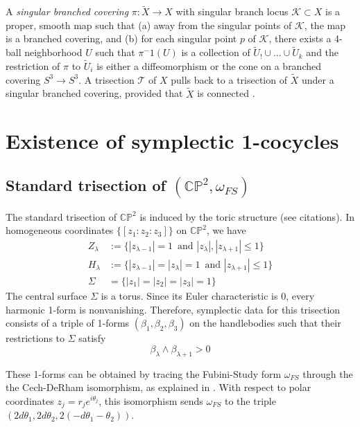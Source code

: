 \documentclass[11pt]{amsart}
\theoremstyle{definition}
\theoremstyle{remark}
\numberwithin{equation}{section}
\newcommand{\cT}{\mathcal{T}}
\newcommand{\cK}{\mathcal{K}}
\newcommand{\CP}{\mathbb{CP}}
\begin{document}
A {\it singular branched covering} $\pi: \widetilde{X} \rightarrow X$ with singular branch locus $\cK \subset X$ is a proper, smooth map such that (a) away from the singular points of $\cK$, the map is a branched covering, and (b) for each singular point $p$ of $\cK$, there exists a 4-ball neighborhood $U$ such that $\pi{^-1}(U)$ is a collection of $\widetilde{U}_! \cup \dots \cup \widetilde{U}_k$ and the restriction of $\pi$ to $\widetilde{U}_i$ is either a diffeomorphism or the cone on a branched covering $S^3 \rightarrow S^3$.  A trisection $\cT$ of $X$ pulls back to a trisection of $\widetilde{X}$ under a singular branched covering, provided that $\widetilde{X}$ is connected \cite[Theorem 4.1]{LMS}.





\section{Existence of symplectic 1-cocycles}


\subsection{Standard trisection of $(\CP^2,\omega_{FS})$}

The standard trisection of $\CP^2$ is induced by the toric structure (see citations).  In homogeneous coordinates $\{[z_1:z_2:z_3]\}$ on $\CP^2$, we have
\begin{align*}
    Z_{\lambda} &:= \{|z_{\lambda-1}| = 1 \, \text{ and } |z_{\lambda}|,|z_{\lambda+1}| \leq 1\} \\
    H_{\lambda} &:= \{|z_{\lambda-1}| = |z_{\lambda}| = 1 \, \text{ and } |z_{\lambda+1}| \leq 1\}\\
    \Sigma &= \{|z_1| = |z_2| = |z_3| = 1\}
\end{align*}
The central surface $\Sigma$ is a torus.  Since its Euler characteristic is 0, every harmonic 1-form is nonvanishing.  Therefore, symplectic data for this trisection consists of a triple of 1-forms $(\beta_1,\beta_2,\beta_3)$ on the handlebodies such that their restrictions to $\Sigma$ satisfy
\[\beta_{\lambda} \wedge \beta_{\lambda+1} > 0\]

These 1-forms can be obtained by tracing the Fubini-Study form $\omega_{FS}$ through the the Cech-DeRham isomorphism, as explained in \cite[Section 2.1]{LC-cohomology}.  With respect to polar coordinates $z_j = r_j e^{i \theta_j}$, this isomorphism sends $\omega_{FS}$ to the triple $(2 d \theta_1, 2 d \theta_2, 2(-d \theta_1 - \theta_2))$.
\end{document}
